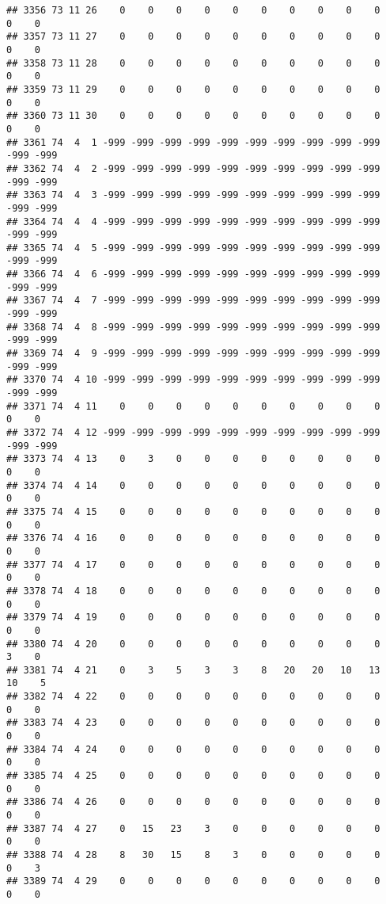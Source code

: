 \documentclass[]{article}
\begin{document}
\begin{verbatim}
## 3356 73 11 26    0    0    0    0    0    0    0    0    0    0    0    0
## 3357 73 11 27    0    0    0    0    0    0    0    0    0    0    0    0
## 3358 73 11 28    0    0    0    0    0    0    0    0    0    0    0    0
## 3359 73 11 29    0    0    0    0    0    0    0    0    0    0    0    0
## 3360 73 11 30    0    0    0    0    0    0    0    0    0    0    0    0
## 3361 74  4  1 -999 -999 -999 -999 -999 -999 -999 -999 -999 -999 -999 -999
## 3362 74  4  2 -999 -999 -999 -999 -999 -999 -999 -999 -999 -999 -999 -999
## 3363 74  4  3 -999 -999 -999 -999 -999 -999 -999 -999 -999 -999 -999 -999
## 3364 74  4  4 -999 -999 -999 -999 -999 -999 -999 -999 -999 -999 -999 -999
## 3365 74  4  5 -999 -999 -999 -999 -999 -999 -999 -999 -999 -999 -999 -999
## 3366 74  4  6 -999 -999 -999 -999 -999 -999 -999 -999 -999 -999 -999 -999
## 3367 74  4  7 -999 -999 -999 -999 -999 -999 -999 -999 -999 -999 -999 -999
## 3368 74  4  8 -999 -999 -999 -999 -999 -999 -999 -999 -999 -999 -999 -999
## 3369 74  4  9 -999 -999 -999 -999 -999 -999 -999 -999 -999 -999 -999 -999
## 3370 74  4 10 -999 -999 -999 -999 -999 -999 -999 -999 -999 -999 -999 -999
## 3371 74  4 11    0    0    0    0    0    0    0    0    0    0    0    0
## 3372 74  4 12 -999 -999 -999 -999 -999 -999 -999 -999 -999 -999 -999 -999
## 3373 74  4 13    0    3    0    0    0    0    0    0    0    0    0    0
## 3374 74  4 14    0    0    0    0    0    0    0    0    0    0    0    0
## 3375 74  4 15    0    0    0    0    0    0    0    0    0    0    0    0
## 3376 74  4 16    0    0    0    0    0    0    0    0    0    0    0    0
## 3377 74  4 17    0    0    0    0    0    0    0    0    0    0    0    0
## 3378 74  4 18    0    0    0    0    0    0    0    0    0    0    0    0
## 3379 74  4 19    0    0    0    0    0    0    0    0    0    0    0    0
## 3380 74  4 20    0    0    0    0    0    0    0    0    0    0    3    0
## 3381 74  4 21    0    3    5    3    3    8   20   20   10   13   10    5
## 3382 74  4 22    0    0    0    0    0    0    0    0    0    0    0    0
## 3383 74  4 23    0    0    0    0    0    0    0    0    0    0    0    0
## 3384 74  4 24    0    0    0    0    0    0    0    0    0    0    0    0
## 3385 74  4 25    0    0    0    0    0    0    0    0    0    0    0    0
## 3386 74  4 26    0    0    0    0    0    0    0    0    0    0    0    0
## 3387 74  4 27    0   15   23    3    0    0    0    0    0    0    0    0
## 3388 74  4 28    8   30   15    8    3    0    0    0    0    0    0    3
## 3389 74  4 29    0    0    0    0    0    0    0    0    0    0    0    0

\end{verbatim}
\end{document}

